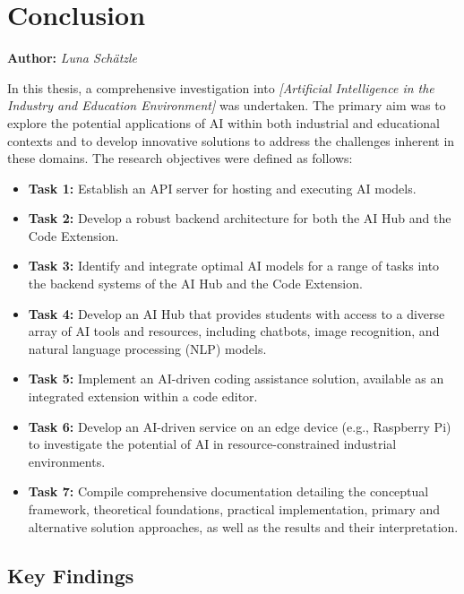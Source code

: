 \chapter{Conclusion}
\label{chap:Conclusion}
\textbf{Author:} \textit{Luna Schätzle}



In this thesis, a comprehensive investigation into \emph{[Artificial Intelligence in the Industry and Education Environment]} was undertaken. The primary aim was to explore the potential applications of AI within both industrial and educational contexts and to develop innovative solutions to address the challenges inherent in these domains. The research objectives were defined as follows:

\begin{itemize}
    \item \textbf{Task 1:} Establish an API server for hosting and executing AI models.
    \item \textbf{Task 2:} Develop a robust backend architecture for both the AI Hub and the Code Extension.
    \item \textbf{Task 3:} Identify and integrate optimal AI models for a range of tasks into the backend systems of the AI Hub and the Code Extension.
    \item \textbf{Task 4:} Develop an AI Hub that provides students with access to a diverse array of AI tools and resources, including chatbots, image recognition, and natural language processing (NLP) models.
    \item \textbf{Task 5:} Implement an AI-driven coding assistance solution, available as an integrated extension within a code editor.
    \item \textbf{Task 6:} Develop an AI-driven service on an edge device (e.g., Raspberry Pi) to investigate the potential of AI in resource-constrained industrial environments.
    \item \textbf{Task 7:} Compile comprehensive documentation detailing the conceptual framework, theoretical foundations, practical implementation, primary and alternative solution approaches, as well as the results and their interpretation.
\end{itemize}

\section{Key Findings}


